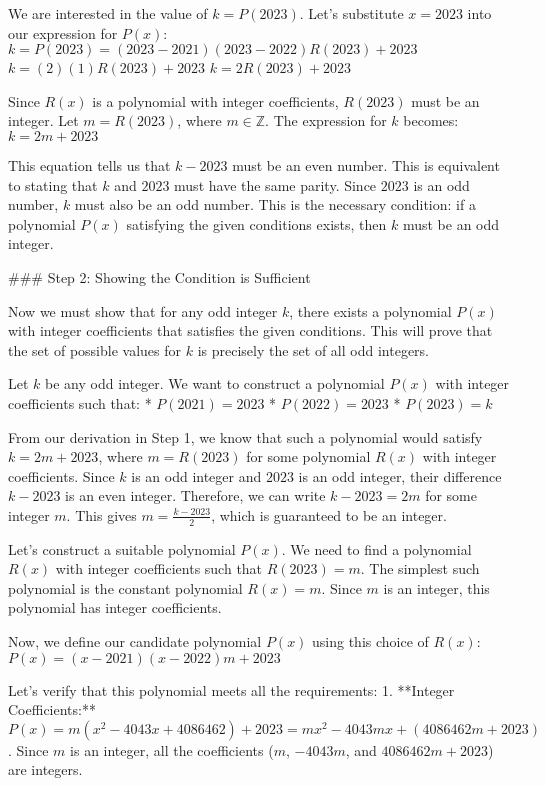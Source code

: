 We are interested in the value of $k = P(2023)$. Let's substitute $x=2023$ into our expression for $P(x)$:
$k = P(2023) = (2023 - 2021)(2023 - 2022)R(2023) + 2023$
$k = (2)(1)R(2023) + 2023$
$k = 2R(2023) + 2023$

Since $R(x)$ is a polynomial with integer coefficients, $R(2023)$ must be an integer. Let $m = R(2023)$, where $m \in \mathbb{Z}$.
The expression for $k$ becomes:
$k = 2m + 2023$

This equation tells us that $k-2023$ must be an even number. This is equivalent to stating that $k$ and $2023$ must have the same parity. Since $2023$ is an odd number, $k$ must also be an odd number.
This is the necessary condition: if a polynomial $P(x)$ satisfying the given conditions exists, then $k$ must be an odd integer.

### Step 2: Showing the Condition is Sufficient

Now we must show that for any odd integer $k$, there exists a polynomial $P(x)$ with integer coefficients that satisfies the given conditions. This will prove that the set of possible values for $k$ is precisely the set of all odd integers.

Let $k$ be any odd integer.
We want to construct a polynomial $P(x)$ with integer coefficients such that:
*   $P(2021) = 2023$
*   $P(2022) = 2023$
*   $P(2023) = k$

From our derivation in Step 1, we know that such a polynomial would satisfy $k = 2m + 2023$, where $m = R(2023)$ for some polynomial $R(x)$ with integer coefficients.
Since $k$ is an odd integer and $2023$ is an odd integer, their difference $k - 2023$ is an even integer. Therefore, we can write $k - 2023 = 2m$ for some integer $m$. This gives $m = \frac{k-2023}{2}$, which is guaranteed to be an integer.

Let's construct a suitable polynomial $P(x)$. We need to find a polynomial $R(x)$ with integer coefficients such that $R(2023) = m$. The simplest such polynomial is the constant polynomial $R(x) = m$. Since $m$ is an integer, this polynomial has integer coefficients.

Now, we define our candidate polynomial $P(x)$ using this choice of $R(x)$:
$P(x) = (x-2021)(x-2022)m + 2023$

Let's verify that this polynomial meets all the requirements:
1.  **Integer Coefficients:** $P(x) = m(x^2 - 4043x + 4086462) + 2023 = mx^2 - 4043mx + (4086462m + 2023)$. Since $m$ is an integer, all the coefficients ($m$, $-4043m$, and $4086462m + 2023$) are integers.

